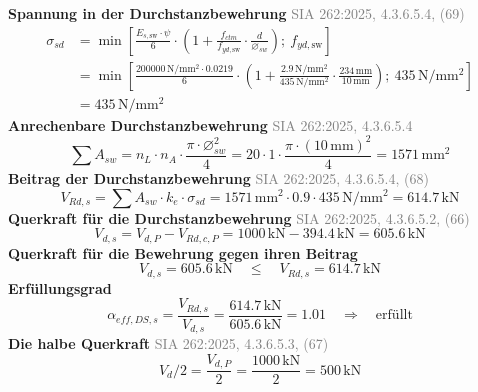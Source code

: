\documentclass[11pt,a4paper]{article}
\newcommand{\normref}[1]{{\small\textcolor{gray}{#1}}}
\begin{document}
\noindent\textbf{Spannung in der Durchstanzbewehrung} \hfill \normref{SIA 262:2025, 4.3.6.5.4, (69)}
\begin{equation*}
\begin{aligned}
  \sigma_{sd} &= \min\left[\frac{E_{s,\text{sw}} \cdot \psi}{6} \cdot \left(1 + \frac{f_{ctm}}{f_{yd,\text{sw}}} \cdot \frac{d}{\varnothing_{sw}}\right);\ f_{yd,\text{sw}}\right] \\
  &= \min\left[\frac{200000\,\mathrm{N}/\mathrm{mm}^{2} \cdot 0.0219}{6} \cdot \left(1 + \frac{2.9\,\mathrm{N}/\mathrm{mm}^{2}}{435\,\mathrm{N}/\mathrm{mm}^{2}} \cdot \frac{234\,\mathrm{mm}}{10\,\mathrm{mm}}\right);\ 435\,\mathrm{N}/\mathrm{mm}^{2}\right] \\
  &= 435\,\mathrm{N}/\mathrm{mm}^{2}
\end{aligned}
\end{equation*}
\noindent\textbf{Anrechenbare Durchstanzbewehrung} \hfill \normref{SIA 262:2025, 4.3.6.5.4}
\begin{equation*}
\sum A_{sw} = n_L \cdot n_A \cdot \frac{\pi \cdot \varnothing_{sw}^{2}}{4} = 20 \cdot 1 \cdot \frac{\pi \cdot \left(10\,\mathrm{mm}\right)^{2}}{4} = 1571\,\mathrm{mm}^{2}
\end{equation*}
\noindent\textbf{Beitrag der Durchstanzbewehrung} \hfill \normref{SIA 262:2025, 4.3.6.5.4, (68)}
\begin{equation*}
V_{Rd,s} = \sum A_{sw} \cdot k_e \cdot \sigma_{sd} = 1571\,\mathrm{mm}^{2} \cdot 0.9 \cdot 435\,\mathrm{N}/\mathrm{mm}^{2} = 614.7\,\mathrm{kN}
\end{equation*}
\noindent\textbf{Querkraft für die Durchstanzbewehrung} \hfill \normref{SIA 262:2025, 4.3.6.5.2, (66)}
\begin{equation*}
V_{d,s} = V_{d,P} - V_{Rd,c,P} = 1000\,\mathrm{kN} - 394.4\,\mathrm{kN} = 605.6\,\mathrm{kN}
\end{equation*}
\noindent\textbf{Querkraft für die Bewehrung gegen ihren Beitrag}
\begin{equation*}
V_{d,s} = 605.6\,\mathrm{kN} \quad \le \quad V_{Rd,s} = 614.7\,\mathrm{kN}
\end{equation*}
\noindent\textbf{Erfüllungsgrad}
\begin{equation*}
\alpha_{eff,DS,s} = \frac{V_{Rd,s}}{V_{d,s}} = \frac{614.7\,\mathrm{kN}}{605.6\,\mathrm{kN}} = 1.01 \quad \Rightarrow \quad \text{erfüllt}
\end{equation*}
\noindent\textbf{Die halbe Querkraft} \hfill \normref{SIA 262:2025, 4.3.6.5.3, (67)}
\begin{equation*}
V_d / 2 = \frac{V_{d,P}}{2} = \frac{1000\,\mathrm{kN}}{2} = 500\,\mathrm{kN}
\end{equation*}
\end{document}
